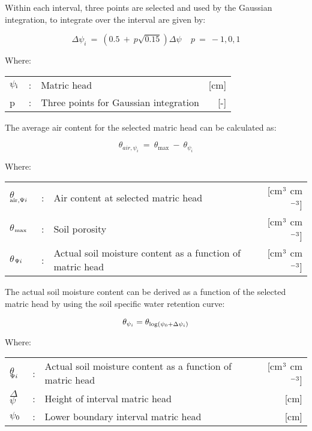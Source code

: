 Within each interval, three points are selected and used by the Gaussian integration, to
integrate over the interval are given by:

\begin{equation}
\label{eq:6.36}
 \Delta  \psi _{i} ~=~ (0.5 ~+~ p \sqrt{0.15} ) \Delta  \psi ~~~~~p~=~-1,0,1
\end{equation}

Where:\\[5pt]
\begin{tabularx}{\textwidth}{llXr}
$\psi$$_{{\rm i}}$ &:& Matric head   & [cm]\\
p &:& Three points for Gaussian integration  & [-]\\
\end{tabularx}

The average air content for the selected matric head can be calculated as:

\begin{equation}
\label{eq:6.37}
\theta  _{air, \psi _{i} } ~=~ \theta _{\max } ~-~ \theta  _{\psi _{i} }
\end{equation}

Where:\\[5pt]
\begin{tabularx}{\textwidth}{llXr}
$\theta$$_{{\rm air,}{\rm \Psi}{i}}$ &:& Air content at selected matric head  
    & [cm$^{{\rm 3}}$ cm$^{{\rm -3}}$]\\
$\theta$$_{{\rm max}}$ &:& Soil porosity  & [cm$^{{\rm 3}}$ cm$^{{\rm -3}}$]\\
$\theta$$_{{\rm \Psi}{i}}$ &:& Actual soil moisture content as a function of matric head  
    & [cm$^{{\rm 3}}$ cm$^{{\rm -3}}$]\\
\end{tabularx}

The actual soil moisture content can be derived as a function of the selected matric head
by using the soil specific water retention curve:

\begin{equation}
\label{eq:6.38}
\theta_{\psi_{i}} = \theta_{{\rm log} (\psi_{0} + \Delta \psi_{i})}
\end{equation}

Where:\\[5pt]
\begin{tabularx}{\textwidth}{llXr}
$\theta$$_{{\rm \Psi}{i}}$ &:& Actual soil moisture content as a function of 
    matric head  & [cm$^{{\rm 3}}$ cm$^{{\rm -3}}$]\\
$\Delta$$\psi$ &:& Height of interval matric head  & [cm]\\
$\psi$$_{{\rm 0}}$ &:& Lower boundary interval matric head  & [cm]\\
\end{tabularx}

